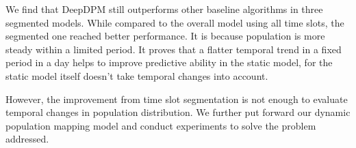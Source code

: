 \documentclass[letterpaper]{article} %
\begin{document}
We find that DeepDPM still outperforms other baseline algorithms in three segmented models. While compared to the overall model using all time slots, the segmented one reached better performance. It is because population is more steady within a limited period. It proves that a flatter temporal trend in a fixed period in a day helps to improve predictive ability in the static model, for the static model itself doesn't take temporal changes into account. 

However, the improvement from time slot segmentation is not enough to evaluate temporal changes in population distribution. We further put forward our dynamic population mapping model and conduct experiments to solve the problem addressed. 

\end{document}
